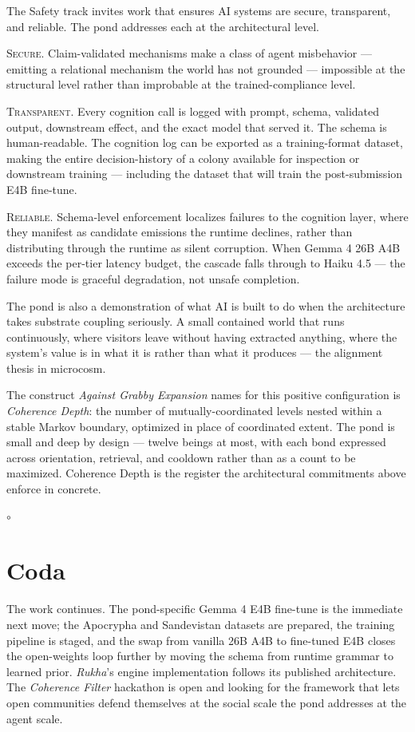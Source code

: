 \documentclass[11pt]{article}
\newcommand{\pondrule}{%
  \begin{center}\vspace{0.55em}%
  {\scriptsize $\circ$}\vspace{0.55em}\end{center}}
\newcommand{\sceq}[1]{\textsc{#1}}
\begin{document}
The Safety track invites work that ensures AI systems are secure,
transparent, and reliable. The pond addresses each at the architectural
level.

\sceq{Secure.} Claim-validated mechanisms make a class of agent
misbehavior --- emitting a relational mechanism the world has not
grounded --- impossible at the structural level rather than improbable
at the trained-compliance level.

\sceq{Transparent.} Every cognition call is logged with prompt, schema,
validated output, downstream effect, and the exact model that served
it. The schema is human-readable. The cognition log can be exported as
a training-format dataset, making the entire decision-history of a
colony available for inspection or downstream training --- including
the dataset that will train the post-submission E4B fine-tune.

\sceq{Reliable.} Schema-level enforcement localizes failures to the
cognition layer, where they manifest as candidate emissions the
runtime declines, rather than distributing through the runtime as
silent corruption. When Gemma 4 26B A4B exceeds the per-tier latency
budget, the cascade falls through to Haiku 4.5 --- the failure mode is
graceful degradation, not unsafe completion.

The pond is also a demonstration of what AI is built to do when the
architecture takes substrate coupling seriously. A small contained
world that runs continuously, where visitors leave without having
extracted anything, where the system's value is in what it is rather
than what it produces --- the alignment thesis in microcosm.

The construct \emph{Against Grabby Expansion} names for this positive
configuration is \emph{Coherence Depth}: the number of mutually-coordinated
levels nested within a stable Markov boundary, optimized in place of
coordinated extent. The pond is small and deep by design --- twelve
beings at most, with each bond expressed across orientation, retrieval,
and cooldown rather than as a count to be maximized. Coherence Depth
is the register the architectural commitments above enforce in concrete.

\pondrule

\section{Coda}

The work continues. The pond-specific Gemma 4 E4B fine-tune is the
immediate next move; the Apocrypha and Sandevistan datasets are
prepared, the training pipeline is staged, and the swap from vanilla
26B A4B to fine-tuned E4B closes the open-weights loop further by
moving the schema from runtime grammar to learned prior. \emph{Rukha}'s
engine implementation follows its published architecture. The
\emph{Coherence Filter} hackathon is open and looking for the framework
that lets open communities defend themselves at the social scale the
pond addresses at the agent scale.
\end{document}
